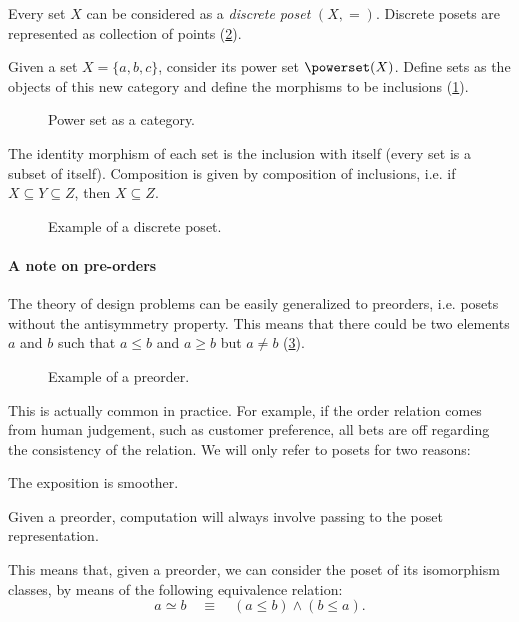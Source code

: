 \begin{example}
\label{ex:discreteposet}
Every set $X$ can be considered as a \emph{discrete poset} $(X,=)$. Discrete posets are represented as collection of points (\cref{fig:discretepos}).

\begin{example}
\label{ex:hasseinclusion}
Given a set $X=\{a,b,c\}$, consider its power set $\powerset(X)$. Define sets as the objects of this new category and define the morphisms to be inclusions (\cref{fig:powersetcat}).
\begin{figure}[h!]
\begin{center}
\end{center}
\caption{Power set as a category. \label{fig:powersetcat}}
\end{figure}
The identity morphism of each set is the inclusion with itself (every set is a subset of itself). Composition is given by composition of inclusions, i.e. if $X\subseteq Y \subseteq Z$, then $X\subseteq Z$. 
\end{example}

\begin{figure}[tbh]
   \centering
   \caption{Example of a discrete poset. \label{fig:discretepos}}
\end{figure}
\end{example}

\paragraph{A note on pre-orders}
The theory of design problems can be easily generalized to preorders, i.e. posets without the antisymmetry property. This means that there could be two elements $a$ and $b$ such that $a\leq b$ and $a \geq b$ but $a \neq b$ (\cref{fig:preorder}).

\begin{figure}[tbh]
\begin{center}
\end{center}
\caption{Example of a preorder. \label{fig:preorder}}
\end{figure}

This is actually common in practice. For example, if the order relation comes from human judgement, such as customer preference, all bets are off regarding the consistency of the relation. We will only refer to posets for two reasons:
\begin{compactenum}
        \item The exposition is smoother.
        \item Given a preorder, computation will always involve passing to the poset representation.
\end{compactenum}
This means that, given a preorder, we can consider the poset of its isomorphism classes, by means of the following equivalence relation:
\begin{equation}
        a \simeq b \quad \equiv \quad (a \leq b) \wedge (b \leq a).
\end{equation}

